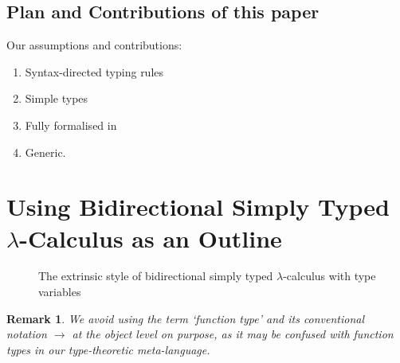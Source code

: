 \documentclass[acmsmall,screen]{acmart}
\theoremstyle{acmdefinition}
\newtheorem{remark}[theorem]{Remark}}
\begin{document}
\subsection{Plan and Contributions of this paper}

Our assumptions and contributions:
\begin{enumerate}
  \item Syntax-directed typing rules
  \item Simple types
  \item Fully formalised in \Agda 
  \item Generic.
\end{enumerate}

\section{Using Bidirectional Simply Typed \texorpdfstring{$\lambda$}{lambda}-Calculus as an Outline} \label{sec:bi-stlc}
\begin{figure}
  \centering
  \small
  \caption{The extrinsic style of bidirectional simply typed $\lambda$-calculus with type variables}
  \label{fig:bi-stlc}
\end{figure}
\begin{remark}
  We avoid using the term `function type' and its conventional notation $\to$ at the object level on purpose, as it may be confused with function types in our type-theoretic meta-language.
\end{remark}
\end{document}
